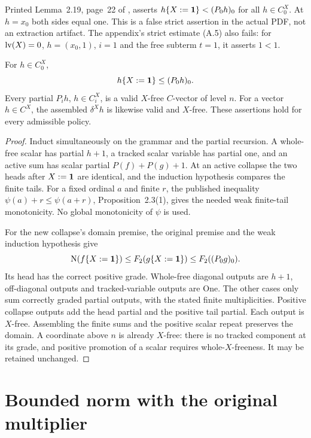 \begin{remark}\label{wwsc:rem:error}
Printed Lemma~2.19, page~22 of \cite{ww}, asserts
$h\{X:=\mathbf1\}<(P_0h)_0$ for all $h\in C_0^X$.
At $h=x_0$ both sides equal one. This is a false strict assertion in
the actual PDF, not an extraction artifact. The appendix's strict
estimate (A.5) also fails: for $\operatorname{lv}(X)=0$, $h=(x_0,1)$, $i=1$ and
the free subterm $t=1$, it asserts $1<1$.
\end{remark}

\begin{theorem}\label{wwsc:thm:weak}
For $h\in C_0^X$,
\[
 h\{X:=\mathbf1\}\le(P_0h)_0.
\]
Every partial $P_i h$, $h\in C_i^X$, is a valid $X$-free $C$-vector
of level $n$. For a vector $h\in C^X$, the assembled $\delta^X h$ is likewise valid and $X$-free.
These assertions hold for every admissible policy.
\end{theorem}
\begin{proof}
Induct simultaneously on the grammar and the partial recursion. A
whole-free scalar has partial $h+1$, a tracked scalar variable has
partial one, and an active sum has scalar partial $P(f)+P(g)+1$.
At an active collapse the two heads after $X:=\mathbf1$ are identical,
and the induction hypothesis compares the finite tails. For a fixed
ordinal $a$ and finite $r$, the published inequality
$\psi(a)+r\le\psi(a+r)$, Proposition~2.3(1), gives the needed weak
finite-tail monotonicity. No global monotonicity of $\psi$ is used.

For the new collapse's domain premise, the original premise and the
weak induction hypothesis give
\[
 \operatorname{N}(f\{X:=\mathbf1\})
 \le F_2(g\{X:=\mathbf1\})\le F_2((P_0g)_0).
\]
Its head has the correct positive grade. Whole-free diagonal outputs
are $h+1$, off-diagonal outputs and tracked-variable outputs are One.
The other cases only sum correctly graded partial outputs, with the
stated finite multiplicities. Positive collapse outputs add the head
partial and the positive tail partial. Each output is $X$-free.
Assembling the finite sums and the positive scalar repeat preserves
the domain. A coordinate above $n$ is already $X$-free: there is no
tracked component at its grade, and positive promotion of a scalar
requires whole-$X$-freeness. It may be retained unchanged.
\end{proof}

\section{Bounded norm with the original multiplier}

